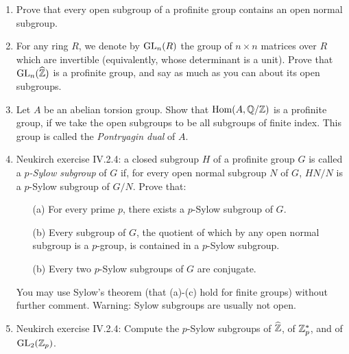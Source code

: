 \begin{enumerate}
\item
Prove that every open subgroup of a profinite group contains an open
normal subgroup.
\item
For any ring $R$, we denote by $\operatorname{GL}_n(R)$ the group of $n \times n$ matrices
over $R$ which are invertible (equivalently, whose determinant is a unit).
Prove that $\operatorname{GL}_n(\widehat{\mathbb{Z}})$ is a profinite group, and say as much as
you can about its open subgroups.
\item
Let $A$ be an abelian torsion group. Show that $\operatorname{Hom}(A, \mathbb{Q}/\mathbb{Z})$ is
a profinite group, if we take the open subgroups to be all subgroups
of finite index. This group is called the \emph{Pontryagin dual} of $A$.
\item
Neukirch exercise IV.2.4:
a closed subgroup $H$ of a profinite group $G$ is called
a \emph{$p$-Sylow subgroup} of $G$ if, for every open normal subgroup $N$
of $G$, $HN/N$ is a $p$-Sylow subgroup of $G/N$. Prove that:
\begin{enumerate}
\item[(a)] For every prime $p$, there exists a $p$-Sylow subgroup of $G$.
\item[(b)] Every subgroup of $G$, the quotient of which by any open 
normal subgroup is a $p$-group, is contained in a $p$-Sylow subgroup.
\item[(b)] Every two $p$-Sylow subgroups of $G$ are conjugate.
\end{enumerate}
You may use Sylow's theorem (that (a)-(c) hold for finite groups)
without further comment. Warning: Sylow subgroups are usually not
open.
\item
Neukirch exercise IV.2.4:
Compute the $p$-Sylow subgroups of $\widehat{\mathbb{Z}}$, of $\mathbb{Z}_p^*$, and
of $\operatorname{GL}_2(\mathbb{Z}_p)$.
\end{enumerate}

%


